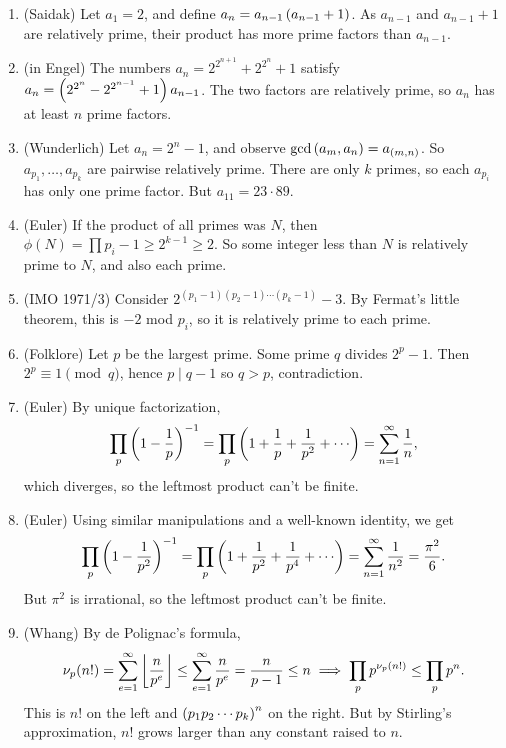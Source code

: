 \documentclass[11pt,paper=letter]{scrartcl}
\begin{document}
\begin{enumerate}
\item (Saidak) Let $a_1 = 2$, and define $a_n = a_{n-1}\left( a_{n-1} + 1 \right)$. As $a_{n-1}$ and $a_{n-1} + 1$ are relatively prime, their product has more prime factors than $a_{n-1}$.

\item (in Engel) The numbers $a_n = 2^{2^{n+1}} + 2^{2^n} + 1$ satisfy $a_n = \left( 2^{2^n} - 2^{2^{n-1}} + 1 \right)a_{n-1}$. The two factors are relatively prime, so $a_n$ has at least $n$ prime factors.

\item (Wunderlich) Let $a_n = 2^n - 1$, and observe $\gcd\left( a_m, a_n \right) = a_{(m, n)}$. So $a_{p_1}, \ldots, a_{p_k}$ are pairwise relatively prime. There are only $k$ primes, so each $a_{p_i}$ has only one prime factor. But $a_{11} = 23 \cdot 89$.

\item (Euler) If the product of all primes was $N$, then $\phi(N) = \prod p_i - 1 \ge 2^{k - 1} \ge 2$. So some integer less than $N$ is relatively prime to $N$, and also each prime.

\item (IMO 1971/3) Consider $2^{(p_1 - 1)(p_2 - 1)\cdots(p_k - 1)} - 3$. By Fermat's little theorem, this is $-2$ mod $p_i$, so it is relatively prime to each prime.

\item (Folklore) Let $p$ be the largest prime. Some prime $q$ divides $2^p - 1$. Then $2^p \equiv 1 \pmod q$, hence $p \mid q - 1$ so $q > p$, contradiction.

\item (Euler) By unique factorization,
$$\prod_p \del{1 - \frac1p}^{-1} = \prod_p \del{1 + \frac1p + \frac1{p^2} + \cdots} = \sum_{n=1}^{\infty}\frac1n,$$
which diverges, so the leftmost product can't be finite.

\item (Euler) Using similar manipulations and a well-known identity, we get $$\prod_p \del{1 - \frac{1}{p^2}}^{-1}= \prod_p \del{1 + \frac1{p^2} + \frac1{p^4} + \cdots} = \sum_{n = 1}^{\infty} \frac{1}{n^2} = \frac{\pi^2}6.$$ But $\pi^2$ is irrational, so the leftmost product can't be finite.

\item (Whang) By de Polignac's formula, $$\nu_p(n!) = \sum_{e=1}^{\infty} \left\lfloor \frac{n}{p^e} \right\rfloor \le \sum_{e=1}^{\infty} \frac n{p^e} = \frac{n}{p-1} \le n \implies \prod_p p^{\nu_p(n!)} \le \prod_p p^n.$$
This is $n!$ on the left and $\left( p_1p_2 \cdots p_k \right)^n$ on the right. But by Stirling's approximation, $n!$ grows larger than any constant raised to $n$.


\end{enumerate}
\end{document}
